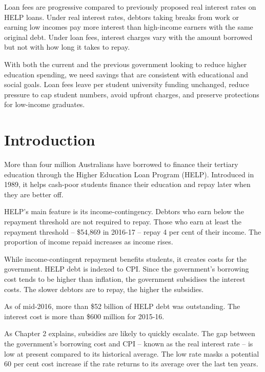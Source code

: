 \documentclass[embargoed]{grattan}
\begin{document}
\begin{overview}
Loan fees are progressive compared to previously proposed real interest rates on HELP loans. Under real interest rates, debtors taking breaks from work or earning low incomes pay more interest than high-income earners with the same original debt. Under loan fees, interest charges vary with the amount borrowed but not with how long it takes to repay.

With both the current and the previous government looking to reduce higher education spending, we need savings that are consistent with educational and social goals. Loan fees leave per student university funding unchanged, reduce pressure to cap student numbers, avoid upfront charges, and preserve protections for low-income graduates.
\end{overview}

\contentspage



\chapter{{Introduction}}\label{introduction}

More than four million Australians have borrowed to finance their tertiary education through the Higher Education Loan Program (HELP). Introduced in 1989, it helps cash-poor students finance their education and repay later when they are better off.

HELP's main feature is its income-contingency. Debtors who earn below the repayment threshold are not required to repay. Those who earn at least the repayment threshold -- \$54,869 in 2016-17 -- repay 4 per cent of their income. The proportion of income repaid increases as income rises.

While income-contingent repayment benefits students, it creates costs for the government. HELP debt is indexed to CPI. Since the government's borrowing cost tends to be higher than inflation, the government subsidises the interest costs. The slower debtors are to repay, the higher the subsidies.

As of mid-2016, more than \$52 billion of HELP debt was outstanding. The interest cost is more than \$600 million for 2015-16.

As Chapter 2 explains, subsidies are likely to quickly escalate. The gap between the government's borrowing cost and CPI -- known as the real interest rate -- is low at present compared to its historical average. The low rate masks a potential 60 per cent cost increase if the rate returns to its average over the last ten years.
\end{document}
